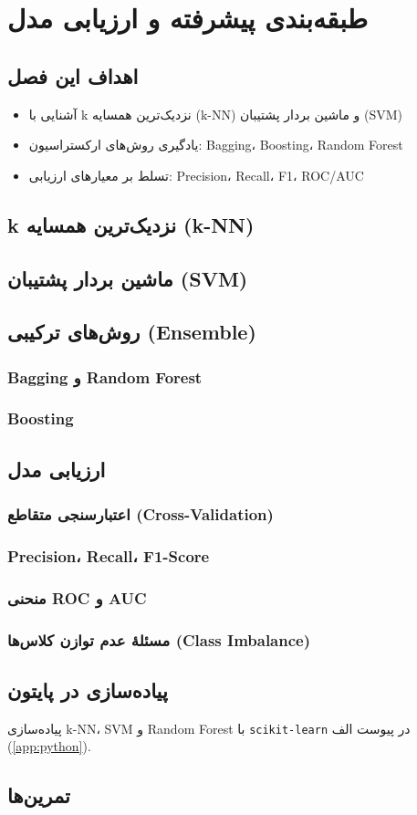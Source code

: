\chapter{طبقه‌بندی پیشرفته و ارزیابی مدل}
\label{ch:classification-advanced}

\section*{اهداف این فصل}
\begin{itemize}
    \item آشنایی با k نزدیک‌ترین همسایه (k-NN) و ماشین بردار پشتیبان (SVM)
    \item یادگیری روش‌های ارکستراسیون: Bagging، Boosting، Random Forest
    \item تسلط بر معیارهای ارزیابی: Precision، Recall، F1، ROC/AUC
\end{itemize}

\section{k نزدیک‌ترین همسایه (k-NN)}
\section{ماشین بردار پشتیبان (SVM)}
\section{روش‌های ترکیبی (Ensemble)}
\subsection{Bagging و Random Forest}
\subsection{Boosting}

\section{ارزیابی مدل}
\subsection{اعتبارسنجی متقاطع (Cross-Validation)}
\subsection{Precision، Recall، F1-Score}
\subsection{منحنی ROC و AUC}
\subsection{مسئلهٔ عدم توازن کلاس‌ها (Class Imbalance)}

\section*{پیاده‌سازی در پایتون}
پیاده‌سازی k-NN، SVM و Random Forest با \texttt{scikit-learn} در پیوست الف (\ref{app:python}).

\section*{تمرین‌ها}
